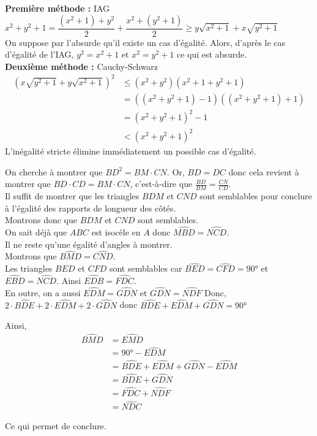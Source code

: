\begin{sol}
\textbf{Première méthode :} IAG \\
$x^2 + y^2 + 1 = \dfrac{(x^2+1)+y^2}{2} + \dfrac{x^2+(y^2+1)}{2} \geq y\sqrt{x^2+1}+x\sqrt{y^2+1}$\\ On suppose par l'absurde qu'il existe un cas d'égalité. Alors, d'après le cas d'égalité de l'IAG, $y^2=x^2+1$ et $x^2 = y^2+1$ ce qui est absurde.\\
\textbf{Deuxième méthode :} Cauchy-Schwarz
\begin{align*}
\left( x\sqrt{y^2+1} + y \sqrt{x^2+1} \right)^2 &\leq \left( x^2 + y^2 \right) \left( x^2 + 1 +y^2 + 1 \right) \\ 
&= \left(\left( x^2 + y^2 +1\right) -1 \right) \left(\left( x^2 +y^2 + 1\right) + 1 \right) \\
&= \left( x^2 +y^2 +1 \right)^2 - 1 \\
&< \left( x^2 +y^2 +1 \right)^2 
\end{align*}
L'inégalité stricte élimine immédiatement un possible cas d'égalité.
\end{sol}


\begin{sol}
On cherche à montrer que $BD^2= BM \cdot CN$. Or, $BD = DC$ donc cela revient à montrer que $BD \cdot CD = BM \cdot CN$, c'est-à-dire que $\frac{BD}{BM} = \frac{CN}{CD}$.\\ Il suffit de montrer que les triangles $BDM$ et $CND$ sont semblables pour conclure à l'égalité des rapports de longueur des côtés. \\ Montrons donc que $BDM$ et $CND$ sont semblables. \\ On sait déjà que $ABC$ est isocèle en $A$ donc $\widehat{MBD} = \widehat{NCD}$. \\ Il ne reste qu'une égalité d'angles à montrer. \\ Montrons que $\widehat{BMD} = \widehat{CND}$. \\ Les triangles $BED$ et $CFD$ sont semblables car $\widehat{BED} = \widehat{CFD} = 90°$ et $\widehat{EBD} = \widehat{NCD}$. Ainsi $\widehat{EDB} = \widehat{FDC}$. \\ En outre, on a aussi $\widehat{EDM} = \widehat{GDN}$ et $\widehat{GDN} = \widehat{NDF}$  Donc, $2 \cdot \widehat{BDE} + 2 \cdot \widehat{EDM} + 2 \cdot \widehat{GDN}$ donc $\widehat{BDE} + \widehat{EDM} + \widehat{GDN} = 90°$

Ainsi, \begin{align*} 
\widehat{BMD} &= \widehat{EMD} \\ &= 90°-\widehat{EDM} \\ &= \widehat{BDE} + \widehat{EDM} + \widehat{GDN} - \widehat{EDM} \\ &= \widehat{BDE} + \widehat{GDN} \\ &= \widehat{FDC} + \widehat{NDF} \\ &= \widehat{NDC} 
\end{align*}

Ce qui permet de conclure.
\end{sol}